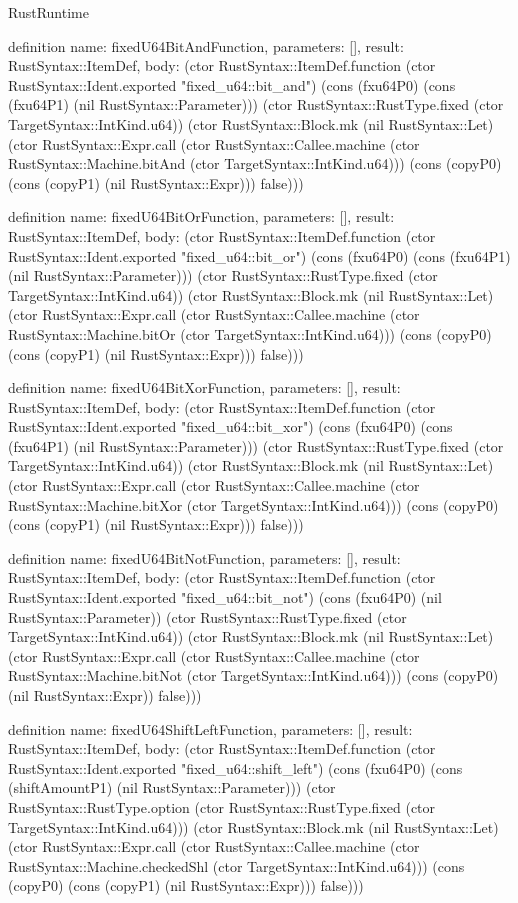 \begin{lexlean}{RustRuntime}
\begin{semanticmodule}
definition{
  name: fixedU64BitAndFunction,
  parameters: [],
  result: RustSyntax::ItemDef,
  body: (ctor RustSyntax::ItemDef.function (ctor RustSyntax::Ident.exported "fixed_u64::bit_and") (cons (fxu64P0) (cons (fxu64P1) (nil RustSyntax::Parameter))) (ctor RustSyntax::RustType.fixed (ctor TargetSyntax::IntKind.u64)) (ctor RustSyntax::Block.mk (nil RustSyntax::Let) (ctor RustSyntax::Expr.call (ctor RustSyntax::Callee.machine (ctor RustSyntax::Machine.bitAnd (ctor TargetSyntax::IntKind.u64))) (cons (copyP0) (cons (copyP1) (nil RustSyntax::Expr))) false)))
}

definition{
  name: fixedU64BitOrFunction,
  parameters: [],
  result: RustSyntax::ItemDef,
  body: (ctor RustSyntax::ItemDef.function (ctor RustSyntax::Ident.exported "fixed_u64::bit_or") (cons (fxu64P0) (cons (fxu64P1) (nil RustSyntax::Parameter))) (ctor RustSyntax::RustType.fixed (ctor TargetSyntax::IntKind.u64)) (ctor RustSyntax::Block.mk (nil RustSyntax::Let) (ctor RustSyntax::Expr.call (ctor RustSyntax::Callee.machine (ctor RustSyntax::Machine.bitOr (ctor TargetSyntax::IntKind.u64))) (cons (copyP0) (cons (copyP1) (nil RustSyntax::Expr))) false)))
}

definition{
  name: fixedU64BitXorFunction,
  parameters: [],
  result: RustSyntax::ItemDef,
  body: (ctor RustSyntax::ItemDef.function (ctor RustSyntax::Ident.exported "fixed_u64::bit_xor") (cons (fxu64P0) (cons (fxu64P1) (nil RustSyntax::Parameter))) (ctor RustSyntax::RustType.fixed (ctor TargetSyntax::IntKind.u64)) (ctor RustSyntax::Block.mk (nil RustSyntax::Let) (ctor RustSyntax::Expr.call (ctor RustSyntax::Callee.machine (ctor RustSyntax::Machine.bitXor (ctor TargetSyntax::IntKind.u64))) (cons (copyP0) (cons (copyP1) (nil RustSyntax::Expr))) false)))
}

definition{
  name: fixedU64BitNotFunction,
  parameters: [],
  result: RustSyntax::ItemDef,
  body: (ctor RustSyntax::ItemDef.function (ctor RustSyntax::Ident.exported "fixed_u64::bit_not") (cons (fxu64P0) (nil RustSyntax::Parameter)) (ctor RustSyntax::RustType.fixed (ctor TargetSyntax::IntKind.u64)) (ctor RustSyntax::Block.mk (nil RustSyntax::Let) (ctor RustSyntax::Expr.call (ctor RustSyntax::Callee.machine (ctor RustSyntax::Machine.bitNot (ctor TargetSyntax::IntKind.u64))) (cons (copyP0) (nil RustSyntax::Expr)) false)))
}

definition{
  name: fixedU64ShiftLeftFunction,
  parameters: [],
  result: RustSyntax::ItemDef,
  body: (ctor RustSyntax::ItemDef.function (ctor RustSyntax::Ident.exported "fixed_u64::shift_left") (cons (fxu64P0) (cons (shiftAmountP1) (nil RustSyntax::Parameter))) (ctor RustSyntax::RustType.option (ctor RustSyntax::RustType.fixed (ctor TargetSyntax::IntKind.u64))) (ctor RustSyntax::Block.mk (nil RustSyntax::Let) (ctor RustSyntax::Expr.call (ctor RustSyntax::Callee.machine (ctor RustSyntax::Machine.checkedShl (ctor TargetSyntax::IntKind.u64))) (cons (copyP0) (cons (copyP1) (nil RustSyntax::Expr))) false)))
}


\end{semanticmodule}
\end{lexlean}
